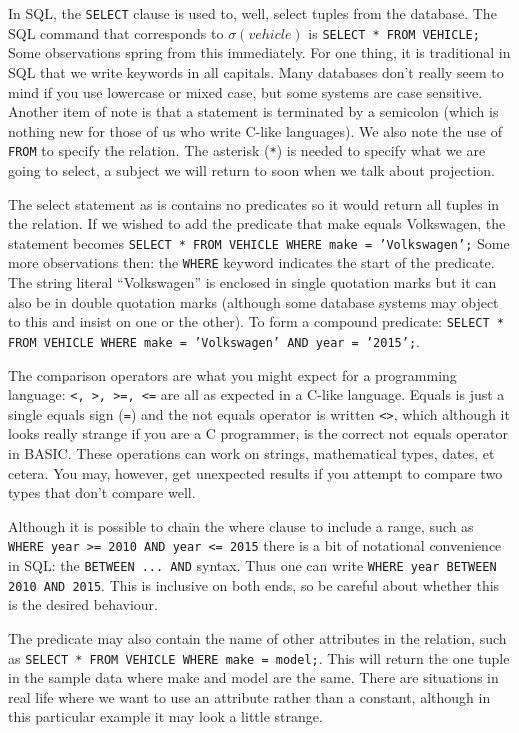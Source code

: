 \documentclass[a4paper]{report}
\begin{document}
In SQL, the \texttt{SELECT} clause is used to, well, select tuples from the database. The SQL command that corresponds to $\sigma( vehicle )$ is \texttt{SELECT * FROM VEHICLE;} Some observations spring from this immediately. For one thing, it is traditional in SQL that we write keywords in all capitals. Many databases don't really seem to mind if you use lowercase or mixed case, but some systems are case sensitive. Another item of note is that a statement is terminated by a semicolon (which is nothing new for those of us who write C-like languages). We also note the use of \texttt{FROM} to specify the relation. The asterisk (\texttt{*}) is needed to specify what we are going to select, a subject we will return to soon when we talk about projection. 

The select statement as is contains no predicates so it would return all tuples in the relation. If we wished to add the predicate that make equals Volkswagen, the statement becomes \texttt{SELECT * FROM VEHICLE WHERE make = 'Volkswagen';} Some more observations then: the \texttt{WHERE} keyword indicates the start of the predicate. The string literal ``Volkswagen'' is enclosed in single quotation marks but it can also be in double quotation marks (although some database systems may object to this and insist on one or the other). To form a compound predicate: \texttt{SELECT * FROM VEHICLE WHERE make = 'Volkswagen' AND year = '2015';}. 

The comparison operators are what you might expect for a programming language: \texttt{<, >, >=, <=} are all as expected in a C-like language. Equals is just a single equals sign (\texttt{=}) and the not equals operator is written \texttt{<>}, which although it looks really strange if you are a C programmer, is the correct not equals operator in BASIC. These operations can work on strings, mathematical types, dates, et cetera. You may, however, get unexpected results if you attempt to compare two types that don't compare well.

Although it is possible to chain the where clause to include a range, such as \texttt{WHERE year >= 2010 AND year <= 2015} there is a bit of notational convenience in SQL: the \texttt{BETWEEN ... AND} syntax. Thus one can write \texttt{WHERE year BETWEEN 2010 AND 2015}. This is inclusive on both ends, so be careful about whether this is the desired behaviour. 

The predicate may also contain the name of other attributes in the relation, such as \texttt{SELECT * FROM VEHICLE WHERE make = model;}. This will return the one tuple in the sample data where make and model are the same. There are situations in real life where we want to use an attribute rather than a constant, although in this particular example it may look a little strange.
\end{document}
